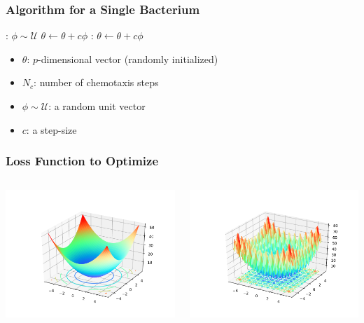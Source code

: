 \documentclass{beamer}
\begin{document}
\begin{frame}
\frametitle{Algorithm for a Single Bacterium}
\begin{algorithmic}[1]
:
  \State $\phi \sim \mathcal{U}$
  \State $\theta \gets \theta + c \phi$
  :
    \State $\theta \gets \theta + c \phi$
  \EndWhile
\EndFor
\end{algorithmic}
\begin{itemize}
  \item $\theta$: $p$-dimensional vector (randomly initialized)
  \item $N_c$: number of chemotaxis steps
  \item $\phi \sim \mathcal{U}$: a random unit vector
  \item $c$: a step-size
\end{itemize}
\end{frame}

\begin{frame}
\frametitle{Loss Function to Optimize}
\begin{columns}
\begin{center}
\includegraphics[scale=0.3]{assets/sphere}
\end{center}
\includegraphics[scale=0.3]{assets/rastrigin}
\end{columns}
\end{frame}
\end{document}
